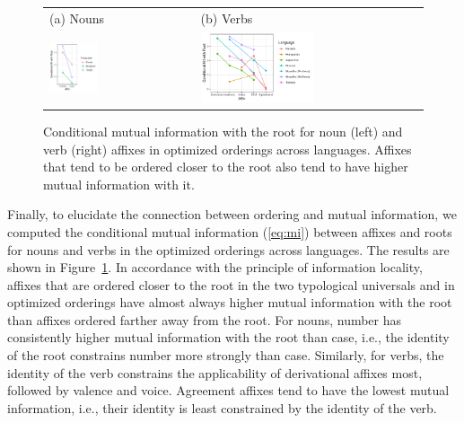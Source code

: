 \documentclass[man]{apa7}
\begin{document}
\begin{figure}
    \centering
    \begin{tabular}{lll}
    (a) Nouns & (b) Verbs \\ 
    \includegraphics[width=0.35\textwidth]{figures/visualizeCPMI_R_nouns.pdf} &
    \includegraphics[width=0.55\textwidth]{figures/visualizeCPMI_R_verbs.pdf}
    \end{tabular}
    \caption{Conditional mutual information with the root for noun (left) and verb (right) affixes in optimized orderings across languages. Affixes that tend to be ordered closer to the root also tend to have higher mutual information with it.}
    \label{fig:cmis}
\end{figure}

Finally, to elucidate the connection between ordering and mutual information, we computed the conditional mutual information (\ref{eq:mi}) between affixes and roots for nouns and verbs in the optimized orderings across languages.
The results are shown in Figure~\ref{fig:cmis}.
In accordance with the principle of information locality, affixes that are ordered closer to the root in the two typological universals and in optimized orderings have almost always higher mutual information with the root than affixes ordered farther away from the root.
For nouns, number has consistently higher mutual information with the root than case, i.e., the identity of the root constrains number more strongly than case.
Similarly, for verbs, the identity of the verb constrains the applicability of derivational affixes most, followed by valence and voice.
Agreement affixes tend to have the lowest mutual information, i.e., their identity is least constrained by the identity of the verb.
\end{document}
